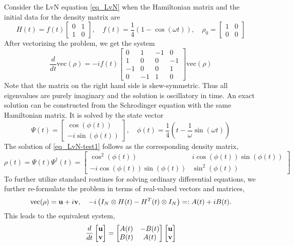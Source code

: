 \documentclass[11pt]{article}
\begin{document}
Consider the LvN equation \eqref{eq_LvN} when the  Hamiltonian matrix and the initial data for the density matrix are
\[
H(t) = f(t)\begin{bmatrix} 0 & 1 \\ 1 & 0 \end{bmatrix},\quad
%
f(t) = \frac{1}{4}\left( 1 - \cos(\omega t) \right),\quad
%
\rho_0 = \begin{bmatrix} 1 & 0 \\ 0 & 0 \end{bmatrix}
\]
After vectorizing the problem, we get the system
\begin{equation}\label{eq_LvN-test1}
\frac{d}{dt}\mbox{vec$(\rho)$} = -i f(t)\begin{bmatrix}
  0 & 1 & -1 & 0 \\
  1 & 0 & 0 & -1 \\
 -1 & 0 & 0 &  1 \\
  0 & -1 & 1 & 0 
  \end{bmatrix}\mbox{vec$(\rho)$}
\end{equation}
Note that the matrix on the right hand side is skew-symmetric. Thus all eigenvalues are purely
imaginary and the solution is oscillatory in time. An exact solution can be constructed from the
Schrodinger equation with the same Hamiltonian matrix. It is solved by the state vector
\[
\Psi(t) = \begin{bmatrix}
\cos(\phi(t)) \\ -i \sin(\phi(t))
  \end{bmatrix},\quad \phi(t) = \frac{1}{4}\left( t - \frac{1}{\omega}\sin(\omega t) \right)
\]
The solution of \eqref{eq_LvN-test1} follows as the corresponding density matrix,
\[
\rho(t) = \Psi(t) \Psi^\dag(t) = \begin{bmatrix}
  \cos^2(\phi(t)) & i \cos(\phi(t)) \sin(\phi(t)) \\
  -i \cos(\phi(t)) \sin(\phi(t)) & \sin^2(\phi(t))
  \end{bmatrix}
\]
To further utilize standard routines for solving ordinary differential equations, we further re-formulate
the problem in terms of real-valued vectors and matrices,
\[
\mbox{vec$(\rho)$} = {\mathbf u} + i {\mathbf v}, \quad  -i\left( I_N\otimes H(t) - H^T(t) \otimes I_N \right) =:
A(t) + i B(t).
\]
This leads to the equivalent system,
\[
\frac{d}{dt}\begin{bmatrix} \ub \\ \vb \end{bmatrix} =
%
\begin{bmatrix}
  A(t) & -B(t) \\ B(t) & A(t)
\end{bmatrix}
\begin{bmatrix} \ub \\ \vb \end{bmatrix}
\]
\end{document}
